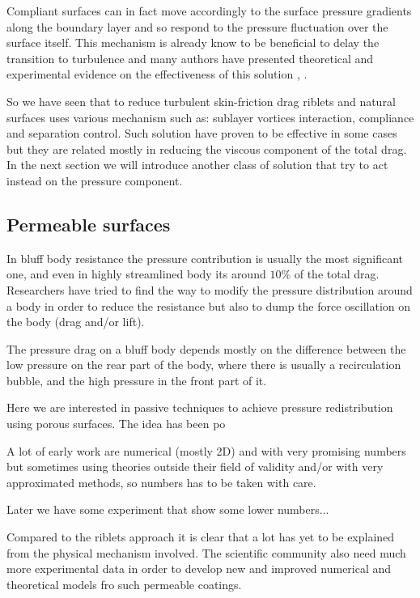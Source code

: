 Compliant surfaces can in fact move accordingly to the surface pressure gradients along the boundary layer and so respond to the pressure fluctuation over the surface itself.
This mechanism is already know to be beneficial to delay the transition to turbulence and many authors have presented theoretical and experimental evidence on the effectiveness of this solution \cite{carpenter1990status}, \cite{bushnell1977effect}.

So we have seen that to reduce turbulent skin-friction drag riblets and natural surfaces uses various mechanism such as: sublayer vortices interaction, compliance and separation control.
Such solution have proven to be effective in some cases but they are related mostly in reducing the viscous component of the total drag.
In the next section we will introduce another class of solution that try to act instead on the pressure component.


\subsection{Permeable surfaces}

In bluff body resistance the pressure contribution is usually the most significant one, and even in highly streamlined body its around  $10\%$ of the total drag.
Researchers have tried to find the way to modify the pressure distribution around a body in order to reduce the resistance but also to dump the force oscillation on the body (drag and/or lift).

The pressure drag on a bluff body depends mostly on the difference between the low pressure on the rear part of the body, where there is usually a recirculation bubble, and the high pressure in the front part of it.

Here we are interested in passive techniques to achieve pressure redistribution using porous surfaces.
The idea has been po


A lot of early work are numerical (mostly 2D) and with very promising numbers but sometimes using theories outside their field of validity and/or with very approximated methods, so numbers has to be taken with care.

Later we have some experiment \citet{klausmann2017drag} that show some lower numbers...

Compared to the riblets approach it is clear that a lot has yet to be explained from the physical mechanism involved. 
The scientific community also need much more experimental data in order to develop new and improved numerical and theoretical models  fro such permeable coatings. 